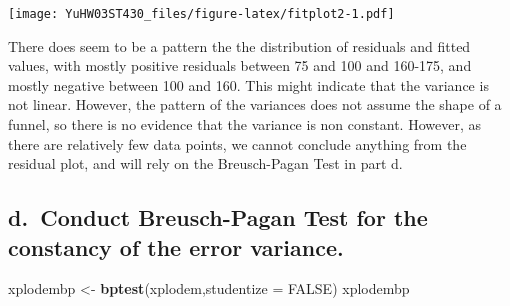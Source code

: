 \documentclass[
]{article}
\newenvironment{Shaded}{\begin{snugshade}}{\end{snugshade}}
\newcommand{\AttributeTok}[1]{\textcolor[rgb]{0.13,0.29,0.53}{#1}}
\newcommand{\ConstantTok}[1]{\textcolor[rgb]{0.56,0.35,0.01}{#1}}
\newcommand{\DecValTok}[1]{\textcolor[rgb]{0.00,0.00,0.81}{#1}}
\newcommand{\FunctionTok}[1]{\textcolor[rgb]{0.13,0.29,0.53}{\textbf{#1}}}
\newcommand{\NormalTok}[1]{#1}
\newcommand{\OtherTok}[1]{\textcolor[rgb]{0.56,0.35,0.01}{#1}}
\newcommand{\SpecialCharTok}[1]{\textcolor[rgb]{0.81,0.36,0.00}{\textbf{#1}}}
\newcommand{\StringTok}[1]{\textcolor[rgb]{0.31,0.60,0.02}{#1}}
\begin{document}
\begin{Shaded}
\end{Shaded}

\texttt{[image: YuHW03ST430\_files/figure-latex/fitplot2-1.pdf]}

There does seem to be a pattern the the distribution of residuals and
fitted values, with mostly positive residuals between 75 and 100 and
160-175, and mostly negative between 100 and 160. This might indicate
that the variance is not linear. However, the pattern of the variances
does not assume the shape of a funnel, so there is no evidence that the
variance is non constant. However, as there are relatively few data
points, we cannot conclude anything from the residual plot, and will
rely on the Breusch-Pagan Test in part d.~

\hypertarget{d.-conduct-breusch-pagan-test-for-the-constancy-of-the-error-variance.}{%
\subsection{d.~Conduct Breusch-Pagan Test for the constancy of the error
variance.}\label{d.-conduct-breusch-pagan-test-for-the-constancy-of-the-error-variance.}}

\begin{Shaded}
\begin{Highlighting}[]
\NormalTok{xplodembp }\OtherTok{\textless{}{-}} \FunctionTok{bptest}\NormalTok{(xplodem,}\AttributeTok{studentize =} \ConstantTok{FALSE}\NormalTok{)}
\NormalTok{xplodembp}
\end{Highlighting}
\end{Shaded}
\end{document}
